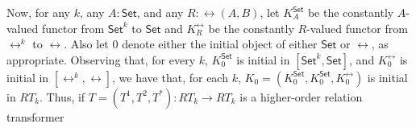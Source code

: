 \documentclass{lmcs}
\theoremstyle{plain}\newtheorem{satz}[thm]{Satz}
\newcommand{\cal}{\mathcal}
\newcommand{\set}{\mathsf{Set}}
\begin{document}
Now, for any $k$, any $A : \set$, and any $R : \rel(A, B)$, let
$K^\set_A$ be the constantly $A$-valued functor from $\set^k$ to
$\set$ and $K^\rel_R$ be the constantly $R$-valued functor from
$\rel^k$ to $\rel$.  Also let $0$ denote either the initial object of
either $\set$ or $\rel$, as appropriate.  Observing that, for every
$k$, $K^\set_0$ is initial in $[\set^k,\set]$, and $K^\rel_0$ is
initial in $[\rel^k,\rel]$, we have that, for each $k$, $K_0 =
(K^\set_0,K^\set_0,K^\rel_0)$ is initial in $RT_k$. Thus, if $T =
(T^1,T^2,T^*) : RT_k \to RT_k$ is a higher-order relation transformer
\end{document}
